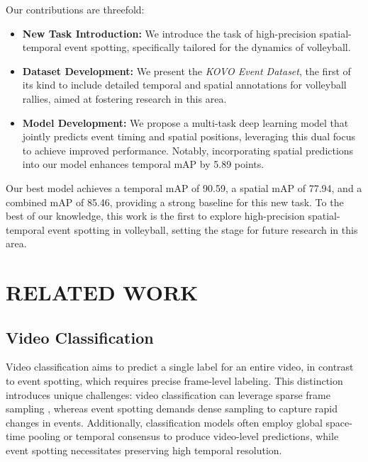 \documentclass[a4paper,twoside]{article}
\begin{document}
Our contributions are threefold:
\begin{itemize}
    \item \textbf{New Task Introduction:} We introduce the task of high-precision spatial-temporal event spotting, specifically tailored for the dynamics of volleyball.
    \item \textbf{Dataset Development:} We present the \textit{KOVO Event Dataset}, the first of its kind to include detailed temporal and spatial annotations for volleyball rallies, aimed at fostering research in this area.
    \item \textbf{Model Development:} We propose a multi-task deep learning model that jointly predicts event timing and spatial positions, leveraging this dual focus to achieve improved performance. Notably, incorporating spatial predictions into our model enhances temporal mAP by 5.89 points.
\end{itemize}

Our best model achieves a temporal mAP of 90.59, a spatial mAP of 77.94, and a combined mAP of 85.46, providing a strong baseline for this new task. To the best of our knowledge, this work is the first to explore high-precision spatial-temporal event spotting in volleyball, setting the stage for future research in this area.





\section{\uppercase{Related work}}

\subsection{Video Classification}
Video classification aims to predict a single label for an entire video, in contrast to event spotting, which requires precise frame-level labeling. This distinction introduces unique challenges: video classification can leverage sparse frame sampling \cite{tsn}, whereas event spotting demands dense sampling to capture rapid changes in events. Additionally, classification models often employ global space-time pooling \cite{8578773} or temporal consensus \cite{zhou2018temporalrelationalreasoningvideos} to produce video-level predictions, while event spotting necessitates preserving high temporal resolution.
\end{document}
